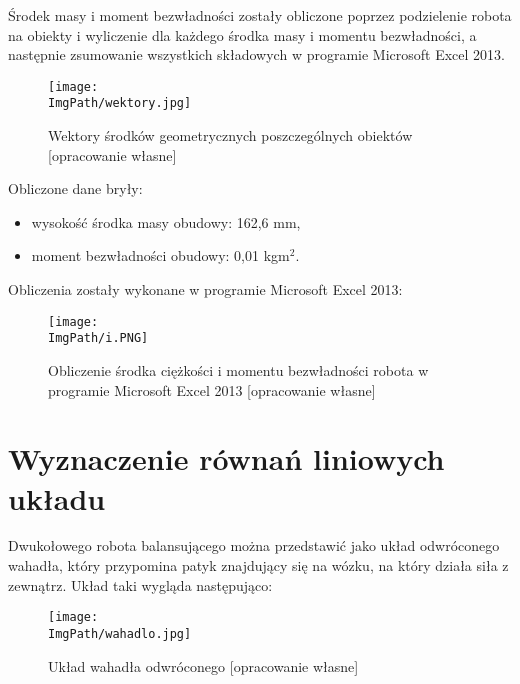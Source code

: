 \documentclass[a4paper,12pt,twoside,openany]{report}
\newcommand{\ImgPath}{.}
\begin{document}
Środek masy i moment bezwładności zostały obliczone poprzez podzielenie robota na obiekty i wyliczenie dla każdego środka masy i momentu bezwładności, a następnie zsumowanie wszystkich składowych w programie Microsoft Excel 2013.

\begin{figure}[!htbp]
	\begin{center}
\centering
\texttt{[image: \\ImgPath/wektory.jpg]}
\end{center}
	\caption{Wektory środków geometrycznych poszczególnych obiektów [opracowanie własne]}
	\label{schematKomunikacji}
\end{figure}
\newpage
\noindent Obliczone dane bryły:
\begin{itemize}
\item wysokość środka masy obudowy: 162,6 mm,
\item moment bezwładności obudowy: 0,01 kgm$^2$.
\end{itemize}

\noindent Obliczenia zostały wykonane w programie Microsoft Excel 2013:

\begin{figure}[!htbp]
	\begin{center}
\centering
\texttt{[image: \\ImgPath/i.PNG]}
\end{center}
	\caption{Obliczenie środka ciężkości i momentu bezwładności robota w programie Microsoft Excel 2013 [opracowanie własne]}
	\label{schematKomunikacji}
\end{figure}

\newpage
\section{Wyznaczenie równań liniowych układu}


Dwukołowego robota balansującego można przedstawić jako układ odwróconego wahadła, który przypomina patyk znajdujący się na wózku, na który działa siła z zewnątrz. Układ taki wygląda następująco:\\

\begin{figure}[!htbp]
	\begin{center}
\centering
\texttt{[image: \\ImgPath/wahadlo.jpg]}
\end{center}
	\caption{Układ wahadła odwróconego [opracowanie własne]}
	\label{schematKomunikacji}
\end{figure}
\end{document}
